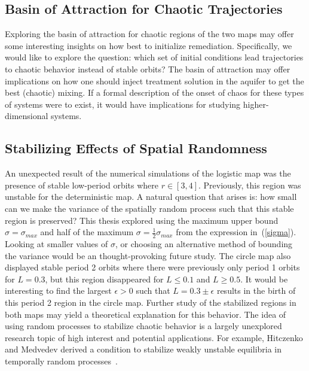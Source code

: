 \subsection{Basin of Attraction for Chaotic Trajectories}
Exploring the basin of attraction for chaotic
regions of the two maps may offer some interesting insights on how
best to initialize remediation. Specifically, we would like to explore the
question: which set of initial conditions lead trajectories to chaotic
behavior instead of stable orbits? The basin of attraction may offer
implications on how one should inject treatment solution in the
aquifer to get the best (chaotic) mixing. If a formal description of
the onset of chaos for these types of systems were to exist, it would
have implications for studying higher-dimensional systems.
\subsection{Stabilizing Effects of Spatial Randomness}
An unexpected result of the numerical simulations of the logistic map
was the presence of stable low-period orbits where $r \in
[3,4]$. Previously, this region was unstable for the deterministic
map. A natural question that arises is: how small can we make the
variance of the spatially random process such that this stable region is
preserved? This thesis explored using the maximum upper bound $\sigma=\sigma_{max}$ and half
of the maximum $\sigma=\frac{1}{2}\sigma_{max}$ from the expression
in~(\ref{sigma}). Looking at smaller values of $\sigma$, or choosing
an alternative method of bounding the variance would be an
thought-provoking future study. The circle map also displayed stable period 2 orbits where there
were previously only period 1 orbits for $L=0.3$, but this region
disappeared for $L\leq 0.1$ and $L \geq 0.5$. It would be interesting
to find the largest $\epsilon > 0$ such that $L=0.3 \pm \epsilon$
results in the birth of this period 2 region in the circle map. Further study of the stabilized
regions in both maps may yield a theoretical
explanation for this behavior. The idea of using random processes to
stabilize chaotic behavior is a largely unexplored research topic of
high interest and potential applications. For example, Hitczenko and Medvedev derived a condition to stabilize weakly
unstable equilibria in temporally random
processes~\cite{hitczenko}. 

